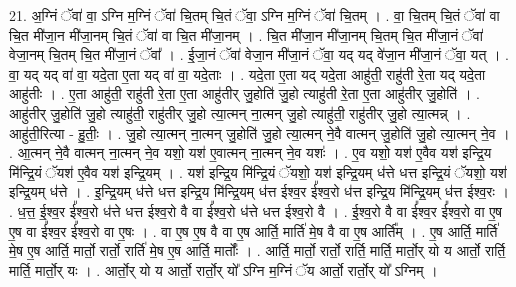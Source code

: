 \documentclass[17pt]{extarticle}
\begin{document}
21. अ॒ग्निं ॅवा॑ वा॒ ऽग्नि म॒ग्निं ॅवा॑ चि॒तम् चि॒तं ॅवा॒ ऽग्नि म॒ग्निं ॅवा॑ चि॒तम् । . वा॒ चि॒तम् चि॒तं ॅवा॑ वा चि॒त मी॑जा॒न मी॑जा॒नम् चि॒तं ॅवा॑ वा चि॒त मी॑जा॒नम् । . चि॒त मी॑जा॒न मी॑जा॒नम् चि॒तम् चि॒त मी॑जा॒नं ॅवा॑ वेजा॒नम् चि॒तम् चि॒त मी॑जा॒नं ॅवा᳚ । . ई॒जा॒नं ॅवा॑ वेजा॒न मी॑जा॒नं ॅवा॒ यद् यद् वे॑जा॒न मी॑जा॒नं ॅवा॒ यत् । . वा॒ यद् यद् वा॑ वा॒ यदे॒ता ए॒ता यद् वा॑ वा॒ यदे॒ताः । . यदे॒ता ए॒ता यद् यदे॒ता आहु॑ती॒ राहु॑ती रे॒ता यद् यदे॒ता आहु॑तीः । . ए॒ता आहु॑ती॒ राहु॑ती रे॒ता ए॒ता आहु॑तीर् जु॒होति॑ जु॒हो त्याहु॑ती रे॒ता ए॒ता आहु॑तीर् जु॒होति॑ । . आहु॑तीर् जु॒होति॑ जु॒हो त्याहु॑ती॒ राहु॑तीर् जु॒हो त्या॒त्मन् ना॒त्मन् जु॒हो त्याहु॑ती॒ राहु॑तीर् जु॒हो त्या॒त्मन्न् । . आहु॑ती॒रित्या - हु॒तीः॒ । . जु॒हो त्या॒त्मन् ना॒त्मन् जु॒होति॑ जु॒हो त्या॒त्मन् ने॒वै वात्मन् जु॒होति॑ जु॒हो त्या॒त्मन् ने॒व । . आ॒त्मन् ने॒वै वात्मन् ना॒त्मन् ने॒व यशो॒ यश॑ ए॒वात्मन् ना॒त्मन् ने॒व यशः॑ । . ए॒व यशो॒ यश॑ ए॒वैव यश॑ इन्द्रि॒य मि॑न्द्रि॒यं ॅयश॑ ए॒वैव यश॑ इन्द्रि॒यम् । . यश॑ इन्द्रि॒य मि॑न्द्रि॒यं ॅयशो॒ यश॑ इन्द्रि॒यम् ध॑त्ते धत्त इन्द्रि॒यं ॅयशो॒ यश॑ इन्द्रि॒यम् ध॑त्ते । . इ॒न्द्रि॒यम् ध॑त्ते धत्त इन्द्रि॒य मि॑न्द्रि॒यम् ध॑त्त ईश्व॒र ई᳚श्व॒रो ध॑त्त इन्द्रि॒य मि॑न्द्रि॒यम् ध॑त्त ईश्व॒रः । . ध॒त्त॒ ई॒श्व॒र ई᳚श्व॒रो ध॑त्ते धत्त ईश्व॒रो वै वा ई᳚श्व॒रो ध॑त्ते धत्त ईश्व॒रो वै । . ई॒श्व॒रो वै वा ई᳚श्व॒र ई᳚श्व॒रो वा ए॒ष ए॒ष वा ई᳚श्व॒र ई᳚श्व॒रो वा ए॒षः । . वा ए॒ष ए॒ष वै वा ए॒ष आर्ति॒ मार्ति॑ मे॒ष वै वा ए॒ष आर्ति᳚म् । . ए॒ष आर्ति॒ मार्ति॑ मे॒ष ए॒ष आर्ति॒ मार्तो॒ रार्तो॒ रार्ति॑ मे॒ष ए॒ष आर्ति॒ मार्तोः᳚ । . आर्ति॒ मार्तो॒ रार्तो॒ रार्ति॒ मार्ति॒ मार्तो॒र् यो य आर्तो॒ रार्ति॒ मार्ति॒ मार्तो॒र् यः । . आर्तो॒र् यो य आर्तो॒ रार्तो॒र् यो᳚ ऽग्नि म॒ग्निं ॅय आर्तो॒ रार्तो॒र् यो᳚ ऽग्निम् । \newline
\end{document}
